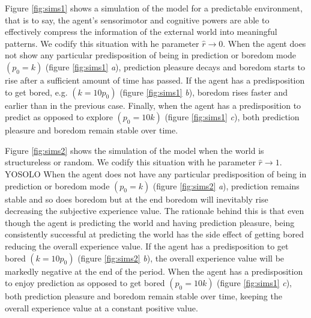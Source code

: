 \documentclass[11pt, onecolumn]{article}
\begin{document}
Figure \ref{fig:sims1} shows a simulation of the model for a predictable environment, that is to say, the agent's sensorimotor and cognitive powers are able to effectively compress the information of the external world into meaningful patterns. We codify this situation with he parameter $\hat{r} \to 0$.
When the agent does not show any particular predisposition of being in prediction or boredom mode $(p_0 = k)$ (figure \ref{fig:sims1} \emph{a}), prediction pleasure decays and boredom starts to rise after a sufficient amount of time has passed. If the agent has a predisposition to  get bored, e.g. $(k = 10p_0)$ (figure \ref{fig:sims1} \emph{b}), boredom rises faster and earlier than in the previous case. Finally, when the agent has a predisposition to predict as opposed to explore $( p_0 = 10k )$ (figure \ref{fig:sims1} \emph{c}), both prediction pleasure and boredom remain stable over time.

Figure \ref{fig:sims2} shows the simulation of the model when the world is structureless or random.  We codify this situation with he parameter $\hat{r} \to 1$.  YOSOLO 
When the agent does not have any particular predisposition of being in prediction or boredom mode $(p_0 = k)$ (figure \ref{fig:sims2} \emph{a}), prediction remains stable and so does boredom but at the end boredom will inevitably rise decreasing the subjective experience value. The rationale behind this is that even though the agent is predicting the world and having prediction pleasure, being consistently successful at predicting the world has the side effect of getting bored reducing the overall experience value. 
If the agent has a predisposition to  get bored $(k = 10p_0)$ (figure \ref{fig:sims2} \emph{b}), the overall experience value will be markedly negative at the end of the period. When the agent has a predisposition to enjoy prediction as opposed to get bored $(p_0 = 10k)$ (figure \ref{fig:sims1} \emph{c}), both prediction pleasure and boredom remain stable over time, keeping the overall experience value at a constant positive value.





\end{document}
